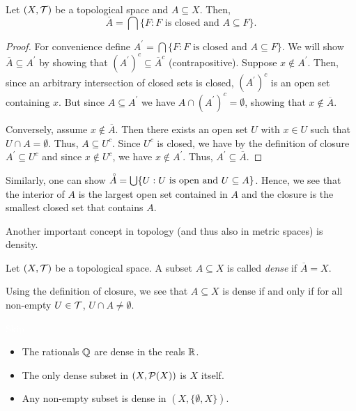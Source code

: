 \documentclass{article}
\begin{document}
\begin{proposition}
 Let $(X,\mathcal{T})$ be a topological space and $A\subseteq X$. Then,
 \begin{equation*}
     \overline{A} = \bigcap \{F \colon F \text{ is closed and } A \subseteq F\}.
 \end{equation*}
\end{proposition}
\begin{proof}
For convenience define $A^\prime = \bigcap \{F \colon F \text{ is closed and } A \subseteq F\}$. We will show $ \overline{A}\subseteq A^\prime$ by showing that $(A^\prime)^c \subseteq \overline{A}^c$ (contrapositive). Suppose $x\not \in A^\prime$. Then, since an arbitrary intersection of closed sets is closed, $(A^\prime)^c$ is an open set containing $x$. But since $A \subseteq A^\prime$ we have $A\cap (A^\prime)^c = \emptyset$, showing that $x\not \in \overline{A}$. 

Conversely, assume $x\not \in \overline{A}$. Then there exists an open set $U$ with $x\in U$ such that $U\cap A = \emptyset$. Thus, $A\subseteq U^c$. Since $U^c$ is closed, we have by the definition of closure $A^\prime \subseteq U^c$ and since $x\not \in U^c$, we have $x\not \in A^\prime$. Thus, $A^\prime\subseteq \overline{A}$.
\end{proof}

Similarly, one can show $\accentset{\circ} A =\bigcup \{U: U \text{ is open and } U \subseteq A \}$. Hence, we see that the interior of $A$ is the largest open set contained in $A$ and the closure is the smallest closed set that contains $A$.

Another important concept in topology (and thus also in metric spaces) is density. 

\begin{definition}
Let $(X,\mathcal{T})$ be a topological space. A subset $A\subseteq X$ is called \emph{dense} if $\overline{A} = X$.
\end{definition}

Using the definition of closure, we see that $A\subseteq X$ is dense if and only if for all non-empty $U\in \mathcal{T}$, $U\cap A \neq \emptyset$.

\begin{example}
\textcolor{white}{Skip}
\begin{itemize}
    \item The rationals ${\mathbb{Q}}$ are dense in the reals ${\mathbb{R}}$. 
    \item The only dense subset in $(X,\mathcal{P}(X))$ is $X$ itself.
    \item Any non-empty subset is dense in $(X,\{\emptyset,X\})$.
\end{itemize}
\end{example}
\end{document}
